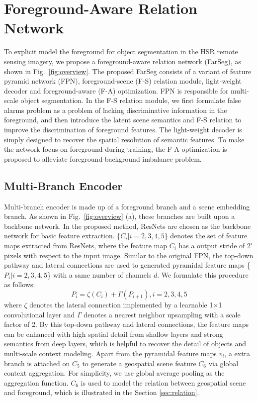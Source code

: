 \documentclass[10pt,twocolumn,letterpaper]{article}
\begin{document}
\section{Foreground-Aware Relation Network}
\label{sec:method}
To explicit model the foreground for object segmentation in the HSR remote sensing imagery, we propose a foreground-aware relation network (FarSeg), as shown in Fig.~\ref{fig:overview}.
The proposed FarSeg consists of a variant of feature pyramid network (FPN), foreground-scene (F-S) relation module, light-weight decoder and foreground-aware (F-A) optimization.
FPN is responsible for multi-scale object segmentation.
In the F-S relation module, we first formulate false alarms problem as a problem of lacking discriminative information in the foreground, and then introduce the latent scene semantics and F-S relation to improve the discrimination of foreground features.
The light-weight decoder is simply designed to recover the spatial resolution of semantic features.
To make the network focus on foreground during training, the F-A optimization is proposed to alleviate foreground-background imbalance problem.


\subsection{Multi-Branch Encoder}
Multi-branch encoder is made up of a foreground branch and a scene embedding branch.
As shown in Fig.~\ref{fig:overview} (a), these branches are built upon a backbone network.
In the proposed method, ResNets \cite{he2016deep} are chosen as the backbone network for basic feature extraction.
\{$C_i | i=2,3,4,5$\} denotes the set of feature maps extracted from ResNets, where the feature map $C_i$ has a output stride of $2^{i}$ pixels with respect to the input image.
Similar to the original FPN, the top-down pathway and lateral connections are used to generated pyramidal feature maps \{$P_i | i=2,3,4,5$\} with a same number of channels $d$.
We formulate this procedure as follows:
\begin{equation}
   P_i = \zeta(C_i) + \Gamma(P_{i+1}), i=2,3,4,5
\end{equation}
where $\zeta$ denotes the lateral connection implemented by a learnable 1$\times$1 convolutional layer and $\Gamma$ denotes a nearest neighbor upsampling with a scale factor of 2.
By this top-down pathway and lateral connections, the feature maps can be enhanced with high spatial detail from shallow layers and strong semantics from deep layers, which is helpful to recover the detail of objects and multi-scale context modeling.
Apart from the pyramidal feature maps $v_i$, a extra branch is attached on $C_5$ to generate a geospatial scene feature $C_6$ via global context aggregation.
For simplicity, we use global average pooling as the aggregation function.
$C_6$ is used to model the relation between geospatial scene and foreground, which is illustrated in the Section \ref{sec:relation}.
\end{document}
